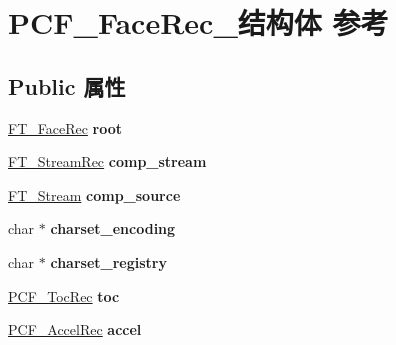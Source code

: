 \hypertarget{struct_p_c_f___face_rec__}{}\section{P\+C\+F\+\_\+\+Face\+Rec\+\_\+结构体 参考}
\label{struct_p_c_f___face_rec__}
\subsection*{Public 属性}
\begin{DoxyCompactItemize}
\item 
\mbox{\label{struct_p_c_f___face_rec___a51fe9d1bbe61a05d6844da61bc6d1086}} 
\hyperlink{struct_f_t___face_rec__}{F\+T\+\_\+\+Face\+Rec} {\bfseries root}
\item 
\mbox{\label{struct_p_c_f___face_rec___ae31e67c5d8b897040caee670ee3137e8}} 
\hyperlink{struct_f_t___stream_rec__}{F\+T\+\_\+\+Stream\+Rec} {\bfseries comp\+\_\+stream}
\item 
\mbox{\label{struct_p_c_f___face_rec___a591bc81b43ed647509d2b179d3bd0a67}} 
\hyperlink{struct_f_t___stream_rec__}{F\+T\+\_\+\+Stream} {\bfseries comp\+\_\+source}
\item 
\mbox{\label{struct_p_c_f___face_rec___a21c4085f5d1a87078d357f85a2cf26bf}} 
char $\ast$ {\bfseries charset\+\_\+encoding}
\item 
\mbox{\label{struct_p_c_f___face_rec___a4296eb308b2f114e911b04ab030816ec}} 
char $\ast$ {\bfseries charset\+\_\+registry}
\item 
\mbox{\label{struct_p_c_f___face_rec___aa5f36f50831f2f8de1caf2cd3cf66151}} 
\hyperlink{struct_p_c_f___toc_rec__}{P\+C\+F\+\_\+\+Toc\+Rec} {\bfseries toc}
\item 
\mbox{\label{struct_p_c_f___face_rec___a95b1db5f12b0093fbf2564778518fdd3}} 
\hyperlink{struct_p_c_f___accel_rec__}{P\+C\+F\+\_\+\+Accel\+Rec} {\bfseries accel}
\item 
\mbox{\label{struct_p_c_f___face_rec___a5e4dadfec8bde8ce312ef16d13df661b}} 

\end{DoxyCompactItemize}
